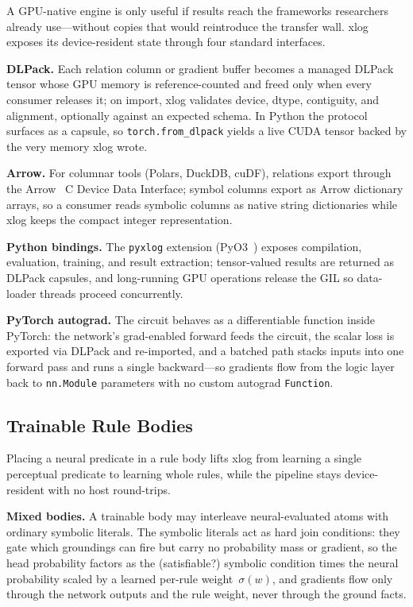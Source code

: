 A GPU-native engine is only useful if results reach the frameworks researchers already use---without copies that would reintroduce the transfer wall. xlog exposes its device-resident state through four standard interfaces.

\textbf{DLPack.} Each relation column or gradient buffer becomes a managed DLPack~\cite{dlpack} tensor whose GPU memory is reference-counted and freed only when every consumer releases it; on import, xlog validates device, dtype, contiguity, and alignment, optionally against an expected schema. In Python the protocol surfaces as a capsule, so \texttt{torch.from\_dlpack} yields a live CUDA tensor backed by the very memory xlog wrote.

\textbf{Arrow.} For columnar tools (Polars, DuckDB, cuDF), relations export through the Arrow~\cite{arrow} C Device Data Interface; symbol columns export as Arrow dictionary arrays, so a consumer reads symbolic columns as native string dictionaries while xlog keeps the compact integer representation.

\textbf{Python bindings.} The \texttt{pyxlog} extension (PyO3~\cite{pyo3}) exposes compilation, evaluation, training, and result extraction; tensor-valued results are returned as DLPack capsules, and long-running GPU operations release the GIL so data-loader threads proceed concurrently.

\textbf{PyTorch autograd.} The circuit behaves as a differentiable function inside PyTorch: the network's grad-enabled forward feeds the circuit, the scalar loss is exported via DLPack and re-imported, and a batched path stacks inputs into one forward pass and runs a single backward---so gradients flow from the logic layer back to \texttt{nn.Module} parameters with no custom autograd \texttt{Function}.

\subsection{Trainable Rule Bodies}\label{subsec:trainable-bodies}

Placing a neural predicate in a rule body lifts xlog from learning a single perceptual predicate to learning whole rules, while the pipeline stays device-resident with no host round-trips.

\textbf{Mixed bodies.} A trainable body may interleave neural-evaluated atoms with ordinary symbolic literals. The symbolic literals act as hard join conditions: they gate which groundings can fire but carry no probability mass or gradient, so the head probability factors as the (satisfiable?) symbolic condition times the neural probability scaled by a learned per-rule weight~$\sigma(w)$, and gradients flow only through the network outputs and the rule weight, never through the ground facts.

